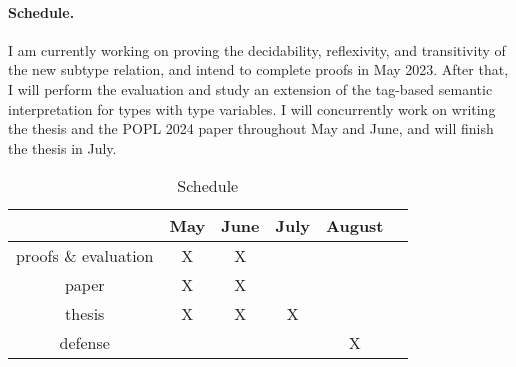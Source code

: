 \paragraph*{Schedule.}
I am currently working on proving the decidability, reflexivity,
and transitivity of the new subtype relation,
and intend to complete proofs in May 2023.
After that, I will perform the evaluation
and study an extension of the tag-based semantic interpretation
for types with type variables.
I will concurrently work on writing the thesis and the POPL 2024 paper
throughout May and June, and will finish the thesis in July.

\begin{table}[h]
  \caption{Schedule}
  \vspace*{0.25em}
  \centering\footnotesize
  \begin{tabular}{c|ccccc}
  \toprule
  & May & June & July & August \\
  \midrule
  proofs \& evaluation & X & X & & \\
  paper & X & X & & \\
  thesis & X & X & X & \\
  defense & & & & X \\
\end{tabular}
\end{table}
